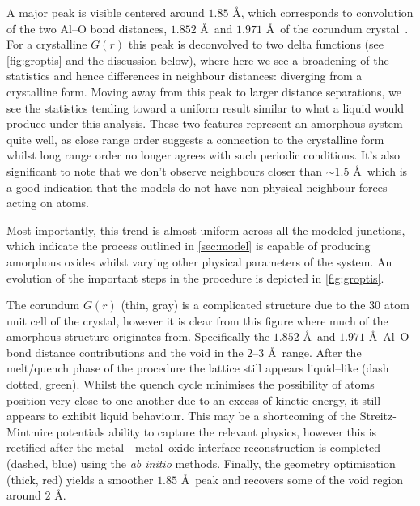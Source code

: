 A major peak is visible centered around $1.85$ \AA, which corresponds to convolution of the two Al--O bond distances, $1.852$ \AA\ and $1.971$ \AA\ of the corundum crystal~\cite{Ishizawa1980}.
For a crystalline $G(r)$ this peak is deconvolved to two delta functions (see \cref{fig:groptis} and the discussion below), where here we see a broadening of the statistics and hence differences in neighbour distances: diverging from a crystalline form.
Moving away from this peak to larger distance separations, we see the statistics tending toward a uniform result similar to what a liquid would produce under this analysis.
These two features represent an amorphous system quite well, as close range order suggests a connection to the crystalline form whilst long range order no longer agrees with such periodic conditions.
It's also significant to note that we don't observe neighbours closer than $\sim\!1.5$ \AA\ which is a good indication that the models do not have non-physical neighbour forces acting on atoms.

Most importantly, this trend is almost uniform across all the modeled junctions, which indicate the process outlined in \cref{sec:model} is capable of producing amorphous oxides whilst varying other physical parameters of the system.
An evolution of the important steps in the procedure is depicted in \cref{fig:groptis}.

The corundum $G(r)$ (thin, gray) is a complicated structure due to the 30 atom unit cell of the crystal, however it is clear from this figure where much of the amorphous structure originates from.
Specifically the $1.852$ \AA\ and $1.971$ \AA\ Al--O bond distance contributions and the void in the $2$--$3$ \AA\ range.
After the melt/quench phase of the procedure the lattice still appears liquid--like (dash dotted, green).
Whilst the quench cycle minimises the possibility of atoms position very close to one another due to an excess of kinetic energy, it still appears to exhibit liquid behaviour.
This may be a shortcoming of the Streitz-Mintmire potentials ability to capture the relevant physics, however this is rectified after the metal---metal--oxide interface reconstruction is completed (dashed, blue) using the \textit{ab initio} methods.
Finally, the geometry optimisation (thick, red) yields a smoother $1.85$ \AA\ peak and recovers some of the void region around $2$ \AA.

